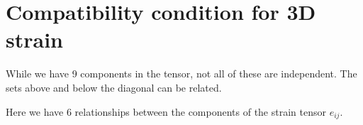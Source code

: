 \section{Compatibility condition for 3D strain}

While we have 9 components in the tensor, not all of these are independent.  The sets above and below the diagonal can be related.
%

Here we have 6 relationships between the components of the strain tensor $e_{ij}$.

